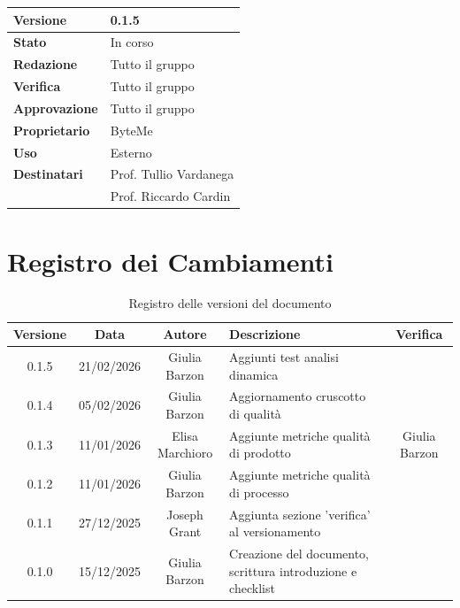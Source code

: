 \documentclass[11pt,a4paper]{article}
\begin{document}
\begin{titlepage}
    \begin{table}[H]
        \centering
        \begin{tabular}{|l|p{5cm}|}
            \hline
            \textbf{Versione} & 0.1.5 \\
            \hline
            \textbf{Stato} & In corso \\
            \hline
            \textbf{Redazione} & Tutto il gruppo \\
            \hline
            \textbf{Verifica} & Tutto il gruppo \\
            \hline
            \textbf{Approvazione} & Tutto il gruppo \\
            \hline
            \textbf{Proprietario} & ByteMe \\
            \hline
            \textbf{Uso} & Esterno \\
            \hline
            \textbf{Destinatari} & Prof. Tullio Vardanega \\ & Prof. Riccardo Cardin \\
            \hline
        \end{tabular}
    \end{table}
    
    \vfill
\end{titlepage}

\thispagestyle{empty}
\section*{Registro dei Cambiamenti}

\begin{table}[H]
    \centering
    \begin{tabular}{|c|c|c|>{\raggedright\arraybackslash}p{}|c|}
        \hline
        \textbf{Versione} & \textbf{Data} & \textbf{Autore} & \textbf{Descrizione} & \textbf{Verifica} \\
        \hline
        0.1.5 & 21/02/2026 & Giulia Barzon & Aggiunti test analisi dinamica &  \\
        \hline
        0.1.4 & 05/02/2026 & Giulia Barzon & Aggiornamento cruscotto di qualità &  \\
        \hline
        0.1.3 & 11/01/2026 & Elisa Marchioro & Aggiunte metriche qualità di prodotto & Giulia Barzon \\
        \hline
        0.1.2 & 11/01/2026 & Giulia Barzon & Aggiunte metriche qualità di processo & \\
        \hline
        0.1.1 & 27/12/2025 & Joseph Grant & Aggiunta sezione 'verifica' al versionamento & \\
        \hline
        0.1.0 & 15/12/2025 & Giulia Barzon & Creazione del documento, scrittura introduzione e checklist & \\
        \hline
    \end{tabular}
    \caption{Registro delle versioni del documento}
    \label{tab:versionamento}
\end{table}
\end{document}
